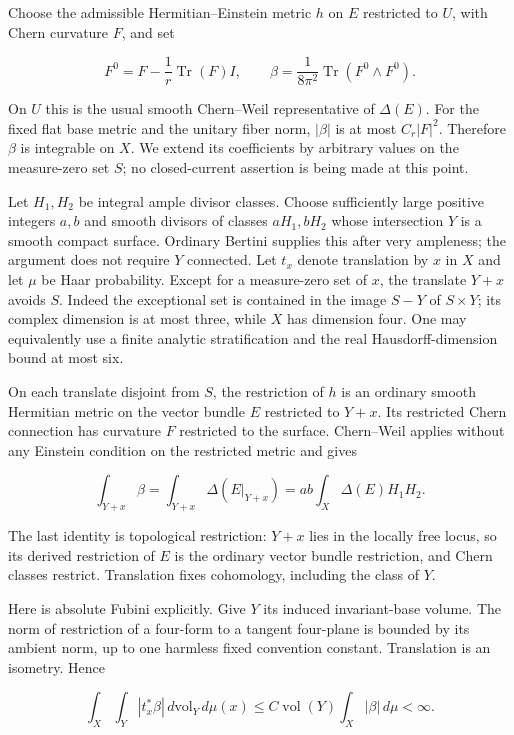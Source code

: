 Choose the admissible Hermitian--Einstein metric \(h\) on \(E\) restricted to \(U\),
with Chern curvature \(F\), and set

\[
 F^0=F-\frac1r\operatorname{Tr}(F)I,
 \qquad
 \beta=\frac1{8\pi^2}\operatorname{Tr}(F^0\wedge F^0).
 \tag{E834.3}
\]

On \(U\) this is the usual smooth Chern--Weil representative of \(\Delta(E)\).
For the fixed flat base metric and the unitary fiber norm,
\(|\beta|\) is at most \(C_r|F|^2\). Therefore
\(\beta\) is integrable on \(X\). We extend its coefficients by arbitrary values
on the measure-zero set \(S\); no closed-current assertion is being made at
this point.

Let \(H_1,H_2\) be integral ample divisor classes. Choose sufficiently large
positive integers \(a,b\) and smooth divisors of classes \(aH_1,bH_2\) whose
intersection \(Y\) is a smooth compact surface. Ordinary Bertini supplies
this after very ampleness; the argument does not require \(Y\) connected.
Let \(t_x\) denote translation by \(x\) in \(X\) and let \(\mu\) be Haar probability.
Except for a measure-zero set of \(x\), the translate \(Y+x\) avoids \(S\). Indeed
the exceptional set is contained in the image \(S-Y\) of \(S\times Y\);
its complex dimension is at most three, while \(X\) has dimension four. One
may equivalently use a finite analytic stratification and the real
Hausdorff-dimension bound at most six.

On each translate disjoint from \(S\), the restriction of \(h\) is an ordinary
smooth Hermitian metric on the vector bundle \(E\) restricted to \(Y+x\). Its
restricted Chern connection has curvature \(F\) restricted to the surface.
Chern--Weil applies without any Einstein condition on the restricted
metric and gives

\[
 \int_{Y+x}\beta
   =\int_{Y+x}\Delta(E|_{Y+x})
   =ab\int_X\Delta(E)H_1H_2.
 \tag{E834.4}
\]

The last identity is topological restriction: \(Y+x\) lies in the locally
free locus, so its derived restriction of \(E\) is the ordinary vector
bundle restriction, and Chern classes restrict. Translation fixes
cohomology, including the class of \(Y\).

Here is absolute Fubini explicitly. Give \(Y\) its induced invariant-base
volume. The norm of restriction of a four-form to a tangent four-plane
is bounded by its ambient norm, up to one harmless fixed convention
constant. Translation is an isometry. Hence

\[
 \int_X\int_Y |t_x^*\beta|\,d\mathrm{vol}_Y\,d\mu(x)
 \le C\operatorname{vol}(Y)\int_X|\beta|\,d\mu
 <\infty.
 \tag{E834.5}
\]

